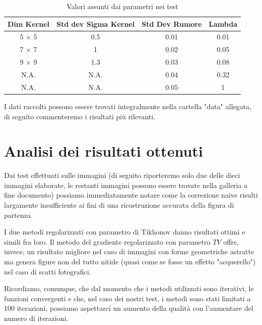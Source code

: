 \documentclass[12pt]{article}
\begin{document}
    \medskip
    \begin{table}[htb]
    \centering
    \begin{tabular}{||c c c c||}
         \hline
         Dim Kernel & Std dev Sigma Kernel & Std Dev Rumore & Lambda \\ [0.5ex]
         \hline\hline
         5 $\times$ 5 & 0.5 & 0.01 & 0.01 \\
         \hline
         7 $\times$ 7 & 1 & 0.02 & 0.05 \\
         \hline
         9 $\times$ 9 & 1.3 & 0.03 & 0.08 \\
         \hline
         N.A. & N.A. & 0.04 & 0.32 \\
         \hline
         N.A. & N.A. & 0.05 & 1 \\ [0.2ex]
         \hline
    \end{tabular}
    \caption{Valori assunti dai parametri nei test}
    \label{table:1}
    \end{table}

    I dati raccolti possono essere trovati integralmente nella cartella "data" allegata, di seguito commenteremo i risultati più rilevanti.

\section{Analisi dei risultati ottenuti}
    Dai test effettuati sulle immagini (di seguito riporteremo solo due delle dieci immagini elaborate, le restanti immagini possono essere trovate nella galleria a fine documento) possiamo immediatamente notare come la correzione naive risulti largamente insufficiente ai fini di una ricostruzione accurata della figura di partenza.

    I due metodi regolarizzati con parametro di Tikhonov danno risultati ottimi e simili fra loro. Il metodo del gradiente regolarizzato con parametro $TV$ offre, invece, un risultato migliore nel caso di immagini con forme geometriche astratte ma genera figure non del tutto nitide (quasi come se fosse un effetto "acquerello") nel caso di scatti fotografici.

    Ricordiamo, comunque, che dal momento che i metodi utilizzati sono iterativi, le funzioni convergenti e che, nel caso dei nostri test, i metodi sono stati limitati a 100 iterazioni, possiamo aspettarci un aumento della qualità con l'aumentare del numero di iterazioni.
\end{document}

